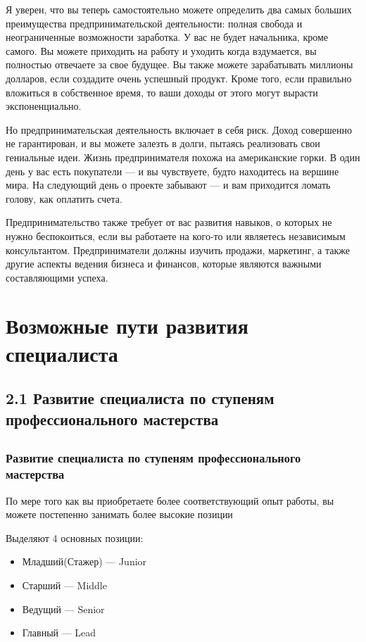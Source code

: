 \documentclass{../industrial-development}
\begin{document}
Я уверен, что вы теперь самостоятельно можете определить два самых больших преимущества предпринимательской деятельности: полная свобода и неограниченные возможности заработка. У вас не будет начальника, кроме самого. Вы можете приходить на работу и уходить когда вздумается, вы полностью отвечаете за свое будущее. Вы также можете зарабатывать миллионы долларов, если создадите очень успешный продукт. Кроме того, если правильно вложиться в собственное время, то ваши доходы от этого могут вырасти экспоненциально.

Но предпринимательская деятельность включает в себя риск. Доход совершенно не гарантирован, и вы можете залезть в долги, пытаясь реализовать свои гениальные идеи. Жизнь предпринимателя похожа на американские горки. В один день у вас есть покупатели — и вы чувствуете, будто находитесь на вершине мира. На следующий день о проекте забывают — и вам приходится ломать голову, как оплатить счета.

Предпринимательство также требует от вас развития навыков, о которых не нужно беспокоиться, если вы работаете на кого-то или являетесь независимым консультантом. Предприниматели должны изучить продажи, маркетинг, а также другие аспекты ведения бизнеса и финансов, которые являются важными составляющими успеха. 


\section{Возможные пути развития специалиста }

\subsection{2.1 Развитие  специалиста по ступеням профессионального мастерства }


\subsection{}

\begin{frame} \frametitle{Развитие  специалиста по ступеням профессионального мастерства}
  \begin{block}{}
  По мере того как вы приобретаете более соответствующий опыт работы, вы можете постепенно занимать более высокие позиции
 \end{block}
\bigskip
Выделяют 4 основных позиции:
  
  \begin{itemize}
  \item Младший(Стажер) --- Junior
  \item Старший --- Middle
  \item Ведущий --- Senior
 \item Главный --- Lead
  \end{itemize}
\end{frame}
\end{document}

